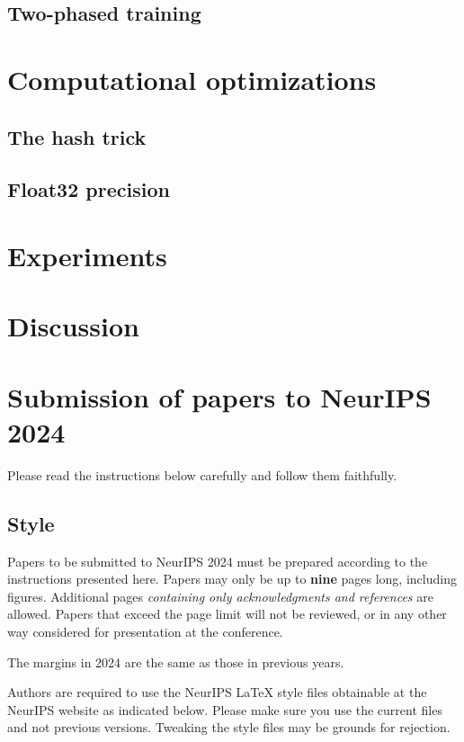 \documentclass{article}
\begin{document}
\subsection{Two-phased training}


\section{Computational optimizations}


\subsection{The hash trick}


\subsection{Float32 precision}


\section{Experiments}


\section{Discussion}


\section{Submission of papers to NeurIPS 2024}


Please read the instructions below carefully and follow them faithfully.


\subsection{Style}


Papers to be submitted to NeurIPS 2024 must be prepared according to the
instructions presented here. Papers may only be up to {\bf nine} pages long,
including figures. Additional pages \emph{containing only acknowledgments and
  references} are allowed. Papers that exceed the page limit will not be
reviewed, or in any other way considered for presentation at the conference.


The margins in 2024 are the same as those in previous years.


Authors are required to use the NeurIPS \LaTeX{} style files obtainable at the
NeurIPS website as indicated below. Please make sure you use the current files
and not previous versions. Tweaking the style files may be grounds for
rejection.
\end{document}
